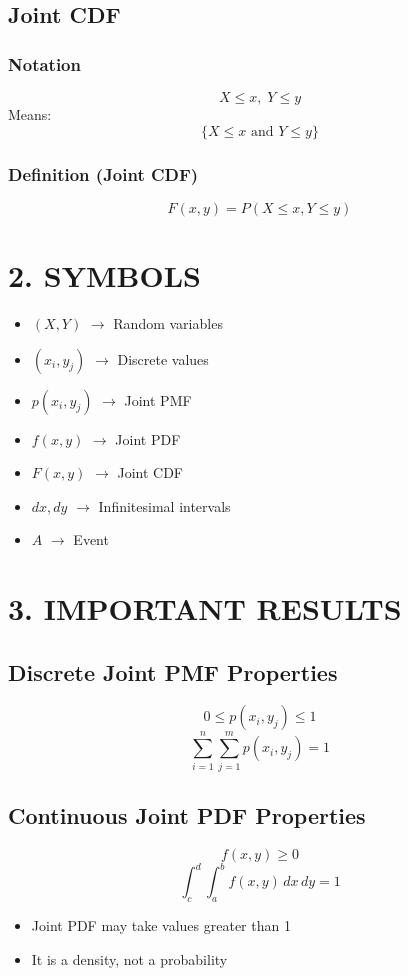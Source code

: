 \documentclass[12pt]{article}
\begin{document}
\subsection*{Joint CDF}

\subsubsection*{Notation}
\[
X \le x, \; Y \le y
\]
Means:
\[
\{X \le x \text{ and } Y \le y\}
\]

\subsubsection*{Definition (Joint CDF)}
\[
F(x,y) = P(X \le x, Y \le y)
\]

\section*{2. SYMBOLS}
\begin{itemize}
\item $(X, Y)$ $\rightarrow$ Random variables
\item $(x_i, y_j)$ $\rightarrow$ Discrete values
\item $p(x_i,y_j)$ $\rightarrow$ Joint PMF
\item $f(x,y)$ $\rightarrow$ Joint PDF
\item $F(x,y)$ $\rightarrow$ Joint CDF
\item $dx, dy$ $\rightarrow$ Infinitesimal intervals
\item $A$ $\rightarrow$ Event
\end{itemize}

\section*{3. IMPORTANT RESULTS}

\subsection*{Discrete Joint PMF Properties}
\[
0 \le p(x_i,y_j) \le 1
\]
\[
\sum_{i=1}^{n} \sum_{j=1}^{m} p(x_i,y_j) = 1
\]

\subsection*{Continuous Joint PDF Properties}
\[
f(x,y) \ge 0
\]
\[
\int_c^d \int_a^b f(x,y)\,dx\,dy = 1
\]

\begin{itemize}
\item Joint PDF may take values greater than 1
\item It is a density, not a probability
\end{itemize}
\end{document}
